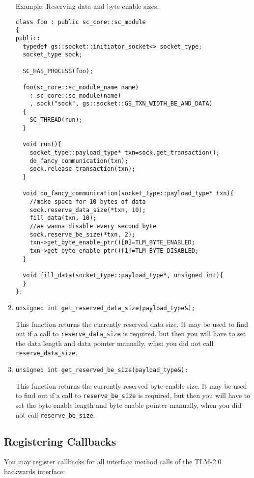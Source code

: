 \documentclass[a4paper,10pt]{article}          %
\begin{document}
\begin{enumerate}
Example: Reserving data and byte enable sizes.

\begin{small}
\begin{verbatim}
class foo : public sc_core::sc_module
{
public:
  typedef gs::socket::initiator_socket<> socket_type;
  socket_type sock;
  
  SC_HAS_PROCESS(foo);

  foo(sc_core::sc_module_name name)
    : sc_core::sc_module(name)
    , sock("sock", gs::socket::GS_TXN_WIDTH_BE_AND_DATA)
  {
    SC_THREAD(run);
  }
  
  void run(){
    socket_type::payload_type* txn=sock.get_transaction();
    do_fancy_communication(txn);
    sock.release_transaction(txn);
  }
  
  void do_fancy_communication(socket_type::payload_type* txn){
    //make space for 10 bytes of data
    sock.reserve_data_size(*txn, 10); 
    fill_data(txn, 10);
    //we wanna disable every second byte
    sock.reserve_be_size(*txn, 2); 
    txn->get_byte_enable_ptr()[0]=TLM_BYTE_ENABLED;
    txn->get_byte_enable_ptr()[1]=TLM_BYTE_DISABLED;
  }
  
  void fill_data(socket_type::payload_type*, unsigned int){
  }
};
\end{verbatim}
\end{small}
\item 
\verb|unsigned int get_reserved_data_size(payload_type&);|

This function returns the currently reserved data size. It may be used to find out if a call to \verb|reserve_data_size| is required, but then you will have to set the data length and data pointer manually, when you did not call \verb|reserve_data_size|.

\item 
\verb|unsigned int get_reserved_be_size(payload_type&);|

This function returns the currently reserved byte enable size. It may be used to find out if a call to \verb|reserve_be_size| is required, but then you will have to set the byte enable length and byte enable pointer manually, when you did not call \verb|reserve_be_size|.

\end{enumerate}

\subsection{Registering Callbacks}
You may register callbacks for all interface method calls of the TLM-2.0 backwards interface:
\end{document}

